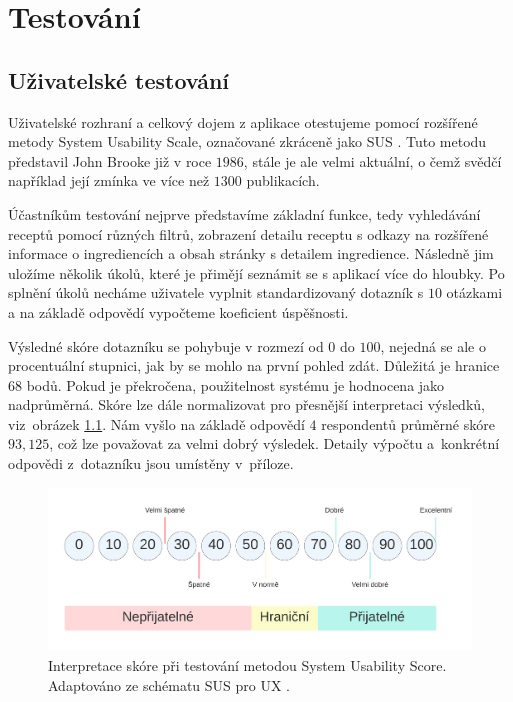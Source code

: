 
\chapter{Testování}

\section{Uživatelské testování}

Uživatelské rozhraní a celkový dojem z aplikace otestujeme pomocí rozšířené metody System Usability Scale, označované zkráceně jako SUS \citep{sus-test}. Tuto metodu představil John Brooke již v roce $1986$, stále je ale velmi aktuální, o čemž svědčí například její zmínka ve více než $1300$ publikacích.

Účastníkům testování nejprve představíme základní funkce, tedy vyhledávání receptů pomocí různých filtrů, zobrazení detailu receptu s odkazy na rozšířené informace o ingrediencích a obsah stránky s detailem ingredience. Následně jim uložíme několik úkolů, které je přimějí seznámit se s aplikací více do hloubky. Po splnění úkolů necháme uživatele vyplnit standardizovaný dotazník s $10$ otázkami a na základě odpovědí vypočteme koeficient úspěšnosti.

Výsledné skóre dotazníku se pohybuje v rozmezí od $0$ do $100$, nejedná se ale o procentuální stupnici, jak by se mohlo na první pohled zdát. Důležitá je hranice $68$ bodů. Pokud je překročena, použitelnost systému je hodnocena jako nadprůměrná. Skóre lze dále normalizovat pro přesnější interpretaci výsledků, viz~obrázek \ref{obr04:sus-score-system}. Nám vyšlo na základě odpovědí $4$ respondentů průměrné skóre $93,125$, což lze považovat za velmi dobrý výsledek. Detaily výpočtu a~konkrétní odpovědi z~dotazníku jsou umístěny v~příloze.

\begin{figure}[h!]\centering
\includegraphics[width=140mm]{../img/sus-score-system}
\caption{Interpretace skóre při testování metodou System Usability Score. Adaptováno ze schématu SUS pro UX \citep{sus-adobe}.}
\label{obr04:sus-score-system}
\end{figure}

